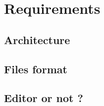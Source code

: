 \documentclass[a4paper,11pt]{article}
\begin{document}
\section{Requirements}

\subsection{Architecture}

\subsection{Files format}

\subsection{Editor or not ?}

\newpage
\tableofcontents
\newpage
\end{document}
